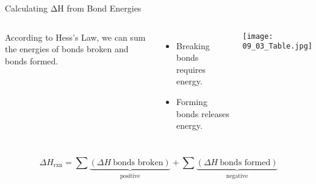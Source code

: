\documentclass[notes=only]{beamer}
\begin{document}
\begin{frame}{Calculating ΔH from Bond Energies}
	\begin{columns}
		According to Hess's Law, we can \alert{sum} the energies of bonds
		broken and bonds formed.
		\begin{itemize}
			\item \alert{Breaking} bonds \alert{requires} energy.
			\item \alert{Forming} bonds \alert{releases} energy.
		\end{itemize}
		\begin{center}
			\texttt{[image: 09\_03\_Table.jpg]}
		\end{center}
	\end{columns}

	\pause

	\begin{equation*} \Delta H_\text{rxn} = \sum \underbrace{(\Delta H~\text{bonds
		broken})}_\text{positive} +
		\sum \underbrace{(\Delta H~\text{bonds formed})}_\text{negative}
	\end{equation*}
\end{frame}
\end{document}
